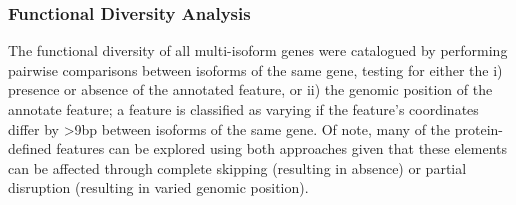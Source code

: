 \subsubsection{Functional Diversity Analysis}
The functional diversity of all multi-isoform genes were catalogued by performing pairwise comparisons between isoforms of the same gene, testing for either the i) presence or absence of the annotated feature, or ii) the genomic position of the annotate feature; a feature is classified as varying if the feature's coordinates differ by >9bp between isoforms of the same gene. Of note, many of the protein-defined features can be explored using both approaches given that these elements can be affected through complete skipping (resulting in absence) or partial disruption (resulting in varied genomic position).


